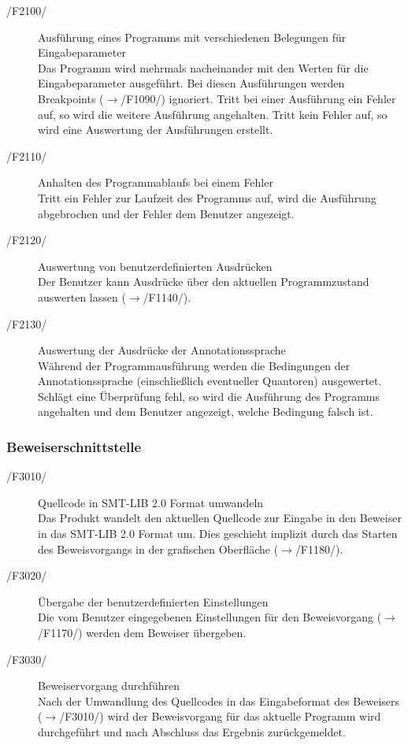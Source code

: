 \documentclass[a4paper,10pt]{article}
\begin{document}
\begin{description}
\item[/F2100/] Ausf\"{u}hrung eines Programms mit verschiedenen Belegungen f\"{u}r Eingabeparameter\\
Das Programm wird mehrmals nacheinander mit den Werten f\"{u}r die Eingabeparameter ausgef\"{u}hrt. Bei diesen Ausf\"{u}hrungen werden Breakpoints ($\to$/F1090/) ignoriert. Tritt bei einer Ausf\"{u}hrung ein Fehler auf, so wird die weitere Ausf\"{u}hrung angehalten. Tritt kein Fehler auf, so wird eine Auswertung der Ausf\"{u}hrungen erstellt.
\item[/F2110/] Anhalten des Programmablaufs bei einem Fehler\\
Tritt ein Fehler zur Laufzeit des Programms auf, wird die Ausf\"{u}hrung abgebrochen und der Fehler dem Benutzer angezeigt.
\item[/F2120/] Auswertung von benutzerdefinierten Ausdr\"{u}cken\\
Der Benutzer kann Ausdr\"{u}cke \"{u}ber den aktuellen Programmzustand auswerten lassen ($\to$/F1140/).
\item[/F2130/] Auswertung der Ausdr\"{u}cke der Annotationssprache\\
W\"{a}hrend der Programmausf\"{u}hrung werden die Bedingungen der Annotationssprache (einschlie\ss{}lich eventueller Quantoren) ausgewertet. Schl\"{a}gt eine \"{U}berpr\"{u}fung fehl, so wird die Ausf\"{u}hrung des Programms angehalten und dem Benutzer angezeigt, welche Bedingung falsch ist.
\end{description}

\subsubsection{Beweiserschnittstelle}
\begin{description}
\item[/F3010/] Quellcode in SMT-LIB 2.0 Format umwandeln\\
Das Produkt wandelt den aktuellen Quellcode zur Eingabe in den Beweiser in das SMT-LIB 2.0 Format um. Dies geschieht implizit durch das Starten des Beweisvorgangs in der grafischen Oberfl\"{a}che ($\to$/F1180/).
\item[/F3020/] \"{U}bergabe der benutzerdefinierten Einstellungen\\
Die vom Benutzer eingegebenen Einstellungen f\"{u}r den Beweisvorgang ($\to$/F1170/) werden dem Beweiser \"{u}bergeben.
\item[/F3030/] Beweiservorgang durchf\"{u}hren\\
Nach der Umwandlung des Quellcodes in das Eingabeformat des Beweisers ($\to$/F3010/) wird der Beweisvorgang f\"{u}r das aktuelle Programm wird durchgef\"{u}hrt und nach Abschluss das Ergebnis zur\"{u}ckgemeldet.
\end{description}
\end{document}
